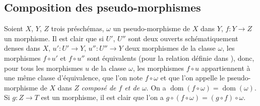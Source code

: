 \subsection{Composition des pseudo-morphismes}
\label{IV.20.3}

\begin{env}[20.3.1]
\label{IV.20.3.1}
Soient $X$, $Y$, $Z$ trois préschémas, $\omega$ un pseudo-morphisme de $X$ dans $Y$, $f:Y\to Z$ un morphisme.
Il est clair que si $U'$, $U''$ sont deux ouverts schématiquement denses dans $X$, $u':U'\to Y$, $u'':U''\to Y$ deux morphismes de la classe $\omega$, les morphismes $f\circ u'$ et $f\circ u''$ sont équivalents (pour la relation définie dans ), donc, pour tous les morphismes $u$ de la classe $\omega$, les morphismes $f\circ u$ appartiennent à une même classe d'équivalence, que l'on note $f\circ\omega$ et que l'on appelle le pseudo-morphisme de $X$ dans $Z$ \emph{composé de $f$ et de $\omega$}.
On a $\operatorname{dom}(f\circ\omega)=\operatorname{dom}(\omega)$.
Si $g:Z\to T$ est un morphisme, il est clair que l'on a $g\circ(f\circ\omega)=(g\circ f)\circ\omega$.
\end{env}

